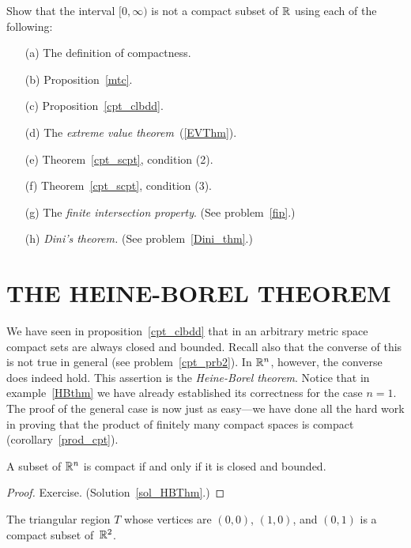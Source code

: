 \begin{prob} Show that the interval $[0,\infty)$ is not a compact subset of $\mathbb{R}$ using each
of the following:
 \begin{enumerate}
  \item[(a)] The definition of compactness.
  \item[(b)] Proposition~\ref{mtc}.
  \item[(c)] Proposition~\ref{cpt_clbdd}.
  \item[(d)] The \emph{extreme value theorem}~(\ref{EVThm}).
  \item[(e)] Theorem~\ref{cpt_scpt}, condition (2).
  \item[(f)] Theorem~\ref{cpt_scpt}, condition (3).
  \item[(g)] The \emph{finite intersection property}. (See problem~\ref{fip}.)
  \item[(h)] \emph{Dini's theorem.} (See problem~\ref{Dini_thm}.)
 \end{enumerate}
\end{prob}







\section{THE HEINE-BOREL THEOREM} We have seen in proposition~\ref{cpt_clbdd} that in an
arbitrary metric space compact sets are always closed and bounded.  Recall also that the
converse of this is not true in general (see problem~\ref{cpt_prb2}).  In $\mathbb{R}^n$, however, the
converse does indeed hold. This assertion is the \emph{Heine-Borel theorem}. Notice that in
example~\ref{HBthm} we have already established its correctness for the case $n=1$. The proof
of the general case is now just as easy---we have done all the hard work in proving that the
product of finitely many compact spaces is compact (corollary~\ref{prod_cpt}).

%
\begin{thm}\label{HBThm} A subset of $\mathbb{R}^n$ is compact if and only if it
is closed and bounded.
\end{thm}

\begin{proof} Exercise.  (Solution~\ref{sol_HBThm}.) \ns  \end{proof}

\begin{exam} The triangular region $T$ whose vertices are $(0,0)$, $(1,0)$, and $(0,1)$ is a
compact subset of~$\mathbb{R}^2$.
\end{exam}


